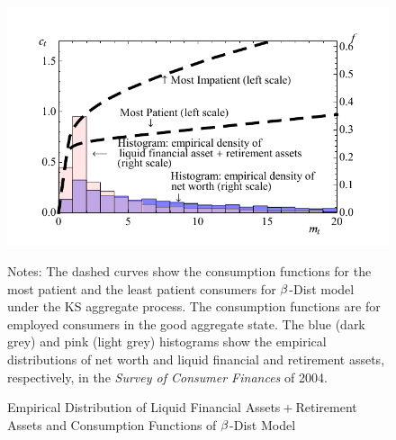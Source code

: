 \documentclass[12pt,titlepage]{econtex}
\newcommand{\tablenotessize}[1]{\footnotesize{#1}} %
\begin{document}
%     


\begin{figure}
  \caption{Empirical Distribution of Liquid Financial
    Assets${}+{}$Retirement Assets and Consumption Functions of
    $\beta$-Dist Model}
  \label{CFuncDistSevenAndHistNetWorthLiqFinPlsRetPlot}
  \begin{center}
    \includegraphics{./Figures/CFuncDistSevenAndHistNetWorthLiqFinPlsRetPlot}
  \end{center}
  \footnotesize Notes: The dashed curves show the consumption functions
  for the most patient and the least patient consumers for
  $\beta$-Dist model under the KS aggregate process. The consumption functions are for employed consumers in the good aggregate state. The blue (dark grey) and pink (light grey)
  histograms show the empirical distributions of net worth and liquid
  financial and retirement assets, respectively, in the \emph{Survey of
    Consumer Finances} of 2004.
\end{figure}
\end{document}
